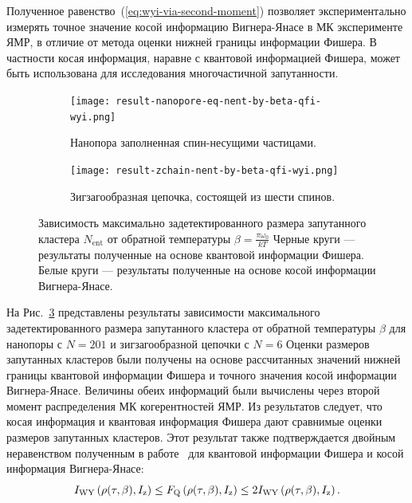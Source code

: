 Полученное равенство~(\ref{eq:wyi-via-second-moment}) позволяет экспериментально измерять точное значение
косой информацию Вигнера-Янасе в МК эксперименте ЯМР,
в отличие от метода оценки нижней границы информации Фишера.
В частности косая информация, наравне с квантовой информацией Фишера,
может быть использована для исследования многочастичной запутанности.

\begin{figure}[H]
  \centering
  \begin{subfigure}[t]{0.49\textwidth}
    \texttt{[image: result-nanopore-eq-nent-by-beta-qfi-wyi.png]}
	\caption{
		Нанопора заполненная спин-несущими частицами.
	}
	\label{fig:result-nanopore-eq-nent-by-beta-qfi-wyi}
  \end{subfigure}
  \hfill
  \begin{subfigure}[t]{0.49\textwidth}
    \texttt{[image: result-zchain-nent-by-beta-qfi-wyi.png]}
	\caption{
		Зигзагообразная цепочка, состоящей из шести спинов.
	}
	\label{fig:result-zchain-nent-by-beta-qfi-wyi}
  \end{subfigure}
  \caption{
    Зависимость максимально задетектированного размера запутанного кластера $N_\mathrm{ent}$
	от обратной температуры $\beta = \frac{\pi \omega_0}{kT}$
	Черные круги --- результаты полученные на основе квантовой информации Фишера.
	Белые круги --- результаты полученные на основе косой информации Вигнера-Янасе.
  }
  \label{fig:result-nent-by-beta-qfi-wyi}
\end{figure}

На Рис.~\ref{fig:result-nent-by-beta-qfi-wyi} представлены результаты зависимости максимального задетектированного размера запутанного кластера от обратной температуры $\beta$ для нанопоры с $N=201$ и зигзагообразной цепочки с $N=6$
Оценки размеров запутанных кластеров были получены на основе рассчитанных значений нижней границы квантовой информации Фишера и точного значения косой информации Вигнера-Янасе.
Величины обеих информаций были вычислены через второй момент распределения МК когерентностей ЯМР.
Из результатов следует,
что косая информация и квантовая информация Фишера дают сравнимые оценки размеров запутанных кластеров.
Этот результат также подтверждается двойным неравенством полученным в работе~\cite{Luo2003pamc} для
квантовой информации Фишера и косой информация Вигнера-Янасе:
%
\begin{equation} \label{eq:qfi-wyi-inequality}
  I_\mathrm{WY}\left( \rho(\tau,\beta), I_\mathrm{z} \right)
  \leq F_\mathrm{Q} \left( \rho(\tau,\beta), I_\mathrm{z} \right)
  \leq 2I_\mathrm{WY}\left( \rho(\tau,\beta), I_\mathrm{z} \right).
\end{equation}